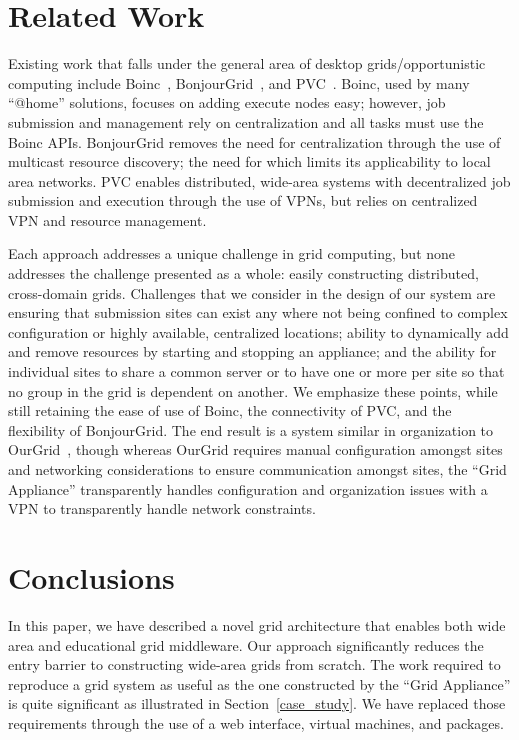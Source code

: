 \documentclass[conference]{IEEEtran}
\begin{document}
\section{Related Work}
\label{related_work}

Existing work that falls under the general area of desktop grids/opportunistic
computing include Boinc~\cite{boinc}, BonjourGrid~\cite{bonjourgrid}, and
PVC~\cite{pvc}.  Boinc, used by many ``@home'' solutions, focuses on adding
execute nodes easy; however, job submission and management rely on
centralization and all tasks must use the Boinc APIs.  BonjourGrid removes the
need for centralization through the use of multicast resource discovery; the
need for which limits its applicability to local area networks.  PVC enables
distributed, wide-area systems with decentralized job submission and execution
through the use of VPNs, but relies on centralized VPN and resource management.

Each approach addresses a unique challenge in grid computing, but none
addresses the challenge presented as a whole: easily constructing distributed,
cross-domain grids.  Challenges that we consider in the design of our system
are ensuring that submission sites can exist any where not being confined to
complex configuration or highly available, centralized locations; ability to
dynamically add and remove resources by starting and stopping an appliance; and
the ability for individual sites to share a common server or to have one or
more per site so that no group in the grid is dependent on another.  We
emphasize these points, while still retaining the ease of use of Boinc, the
connectivity of PVC, and the flexibility of BonjourGrid.  The end result is a
system similar in organization to OurGrid~\cite{ourgrid}, though whereas OurGrid
requires manual configuration amongst sites and networking considerations to
ensure communication amongst sites, the ``Grid Appliance'' transparently handles
configuration and organization issues with a VPN to transparently handle network
constraints.

\section{Conclusions}
\label{conclusions}

In this paper, we have described a novel grid architecture that enables both
wide area and educational grid middleware.  Our approach significantly reduces
the entry barrier to constructing wide-area grids from scratch.  The work
required to reproduce a grid system as useful as the one constructed by the
``Grid Appliance'' is quite significant as illustrated in
Section~\ref{case_study}.  We have replaced those requirements through the use
of a web interface, virtual machines, and packages.
\end{document}
